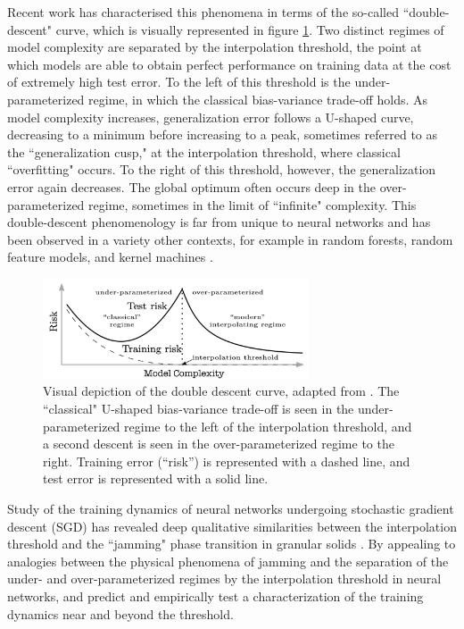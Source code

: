 \documentclass[a4paper, 12pt]{article}
\begin{document}
Recent work \cite{belkinReconcilingModernMachine2019} has characterised this phenomena in terms of the so-called ``double-descent" curve, which is visually represented in figure \ref{doubledescent}. Two distinct regimes of model complexity are separated by the interpolation threshold, the point at which models are able to obtain perfect performance on training data at the cost of extremely high test error. To the left of this threshold is the under-parameterized regime, in which the classical bias-variance trade-off holds. As model complexity increases, generalization error follows a U-shaped curve, decreasing to a minimum before increasing to a peak, sometimes referred to as the ``generalization cusp," at the interpolation threshold, where classical ``overfitting" occurs. To the right of this threshold, however, the generalization error again decreases. The global optimum often occurs deep in the over-parameterized regime, sometimes in the limit of ``infinite" complexity. This double-descent phenomenology is far from unique to neural networks and has been observed in a variety other contexts, for example in random forests, random feature models, and kernel machines \cite{ belkinReconcilingModernMachine2019, belkinUnderstandDeepLearning2018}.\\

\begin{figure}[ht]
\centering
\includegraphics[width=0.7\textwidth]{docs/assets/double_descent_reconciling.png}
\caption{Visual depiction of the double descent curve, adapted from \cite{belkinReconcilingModernMachine2019}. The ``classical" U-shaped bias-variance trade-off is seen in the under-parameterized regime to the left of the interpolation threshold, and a second descent is seen in the over-parameterized regime to the right. Training error (``risk'') is represented with a dashed line, and test error is represented with a solid line.}
\label{doubledescent}
\end{figure}


Study of the training dynamics of neural networks undergoing stochastic gradient descent (SGD)  has revealed deep qualitative similarities between the interpolation threshold and the ``jamming" phase transition in granular solids \cite{baity-jesiComparingDynamicsDeep2019, geigerJammingTransitionParadigm2019}. By appealing to analogies between the physical phenomena of jamming and the separation of the under- and over-parameterized regimes by the interpolation threshold in neural networks, \cite{geigerJammingTransitionParadigm2019} and \cite{spiglerJammingTransitionOverparametrization2019} predict and empirically test a characterization of the training dynamics near and beyond the threshold. 
\end{document}
